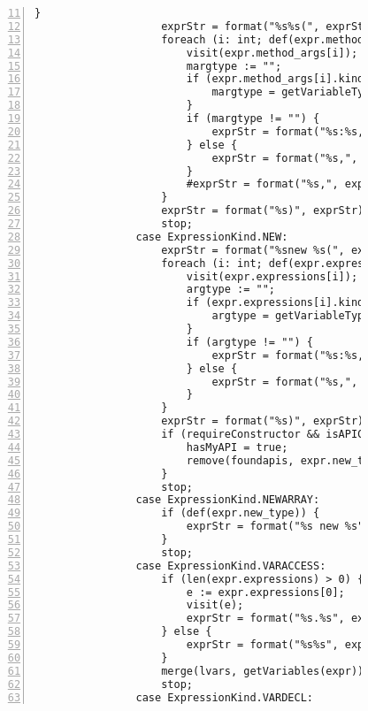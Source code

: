 \begin{figure}[ht!]
\begin{lstlisting}[numbers=left, tabsize=4, escapechar=@, caption={API Usage Mining Analysis},label={lst:aun-code}, firstline = 11, firstnumber = 11, lastline = 60]
                    }
                    exprStr = format("%s%s(", exprStr, expr.method);
                    foreach (i: int; def(expr.method_args[i])) {
                        visit(expr.method_args[i]);  
                        margtype := "";
                        if (expr.method_args[i].kind == ExpressionKind.VARACCESS) {
                            margtype = getVariableType(expr.method_args[i].variable, false);
                        }
                        if (margtype != "") {
                            exprStr = format("%s:%s,", exprStr, margtype);
                        } else {
                            exprStr = format("%s,", exprStr);    
                        }
                        #exprStr = format("%s,", exprStr);
                    }
                    exprStr = format("%s)", exprStr);
                    stop;
                case ExpressionKind.NEW:
                    exprStr = format("%snew %s(", exprStr, expr.new_type.name);
                    foreach (i: int; def(expr.expressions[i])) {
                        visit(expr.expressions[i]);  
                        argtype := "";
                        if (expr.expressions[i].kind == ExpressionKind.VARACCESS) {
                            argtype = getVariableType(expr.expressions[i].variable, false);
                        }
                        if (argtype != "") {
                            exprStr = format("%s:%s,", exprStr, argtype);
                        } else {
                            exprStr = format("%s,", exprStr);    
                        }
                    }
                    exprStr = format("%s)", exprStr);
                    if (requireConstructor && isAPIConstructor(expr.new_type.name)) {
                        hasMyAPI = true;
                        remove(foundapis, expr.new_type.name);
                    }
                    stop;
                case ExpressionKind.NEWARRAY:
                    if (def(expr.new_type)) {
                        exprStr = format("%s new %s", exprStr, expr.new_type.name);
                    }
                    stop;
                case ExpressionKind.VARACCESS:
                    if (len(expr.expressions) > 0) {
                        e := expr.expressions[0];
                        visit(e);
                        exprStr = format("%s.%s", exprStr, expr.variable);
                    } else {
                        exprStr = format("%s%s", exprStr, expr.variable);
                    }
                    merge(lvars, getVariables(expr));
                    stop;
                case ExpressionKind.VARDECL:

\end{lstlisting}
\end{figure}
